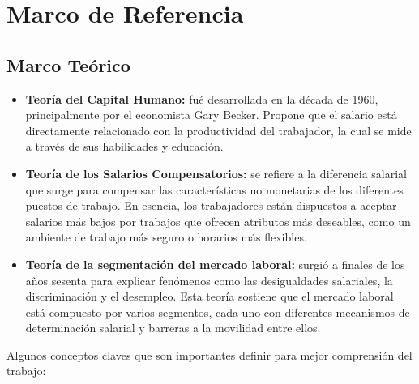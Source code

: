 \documentclass[oneside,11pt]{Latex/Classes/PhDthesisPSnPDF}
\begin{document}
\chapter{Marco de Referencia}

\section{Marco Teórico}

\begin{itemize}
\item
  \textbf{Teoría del Capital Humano:} fué desarrollada en la década de
  1960, principalmente por el economista Gary Becker. Propone que el
  salario está directamente relacionado con la productividad del
  trabajador, la cual se mide a través de sus habilidades y educación.
\item
  \textbf{Teoría de los Salarios Compensatorios:} se refiere a la
  diferencia salarial que surge para compensar las características no
  monetarias de los diferentes puestos de trabajo. En esencia, los
  trabajadores están dispuestos a aceptar salarios más bajos por
  trabajos que ofrecen atributos más deseables, como un ambiente de
  trabajo más seguro o horarios más flexibles.
\item
  \textbf{Teoría de la segmentación del mercado laboral:} surgió a
  finales de los años sesenta para explicar fenómenos como las
  desigualdades salariales, la discriminación y el desempleo. Esta
  teoría sostiene que el mercado laboral está compuesto por varios
  segmentos, cada uno con diferentes mecanismos de determinación
  salarial y barreras a la movilidad entre ellos.
\end{itemize}

Algunos conceptos claves que son importantes definir para mejor
comprensión del trabajo:
\end{document}
